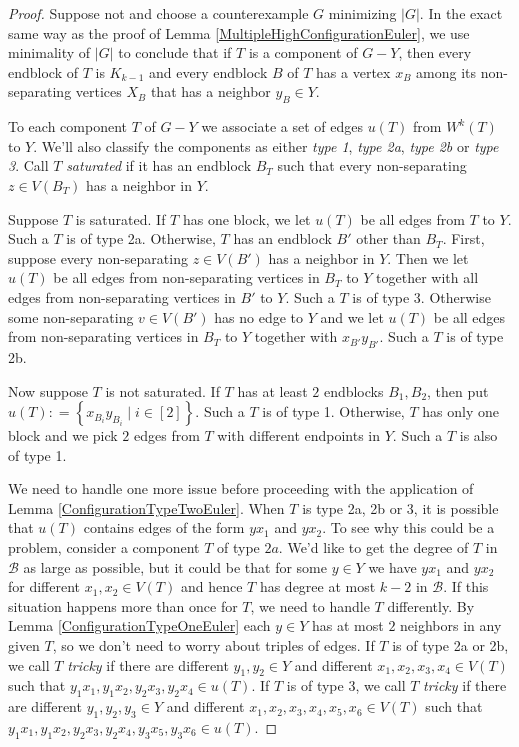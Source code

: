\documentclass[12pt]{article}
\theoremstyle{plain}
\theoremstyle{definition}
\theoremstyle{remark}
\newcommand{\fancy}[1]{\mathcal{#1}}
\newcommand{\B}{\fancy{B}}
\newcommand{\setbs}[2]{\left\{ #1 \mid #2 \right\}}
\newcommand{\card}[1]{\left|#1\right|}
\newcommand{\irange}[1]{\left[#1\right]}
\newcommand{\DefinedAs}{\mathrel{\mathop:}=}
\begin{document}
\begin{proof}
Suppose not and choose a counterexample $G$ minimizing $\card{G}$.  In the exact same way as the proof of Lemma \ref{MultipleHighConfigurationEuler}, we use minimality of $\card{G}$ to conclude that if $T$ is a component of $G-Y$, then every endblock of $T$ is $K_{k-1}$ and every endblock $B$ of $T$ has a vertex $x_B$ among its non-separating vertices $X_B$ that has a neighbor $y_B \in Y$.

To each component $T$ of $G-Y$ we associate a set of edges $u(T)$ from $W^k(T)$ to $Y$. We'll also classify the components as either \emph{type 1}, \emph{type 2a}, \emph{type 2b} or \emph{type 3}. Call $T$ \emph{saturated} if it has an endblock $B_T$ such that every non-separating $z \in V(B_T)$ has a neighbor in $Y$.  

Suppose $T$ is saturated.  If $T$ has one block, we let $u(T)$ be all edges from $T$ to $Y$.  Such a $T$ is of type 2a.  Otherwise, $T$ has an endblock $B'$ other than $B_T$.  First, suppose every non-separating $z \in V(B')$ has a neighbor in $Y$.  Then we let $u(T)$ be all edges from non-separating vertices in $B_T$ to $Y$ together with all edges from non-separating vertices in $B'$ to $Y$.  Such a $T$ is of type 3.  Otherwise some non-separating $v \in V(B')$ has no edge to $Y$ and we let $u(T)$ be all edges from non-separating vertices in $B_T$ to $Y$ together with $x_{B'}y_{B'}$.  Such a $T$ is of type 2b.

Now suppose $T$ is not saturated.  If $T$ has at least $2$ endblocks $B_1, B_2$, then put $u(T) \DefinedAs \setbs{x_{B_i}y_{B_i}}{i \in \irange{2}}$.  Such a $T$ is of type 1.  Otherwise, $T$ has only one block and we pick $2$ edges from $T$ with different endpoints in $Y$.  Such a $T$ is also of type 1.  

We need to handle one more issue before proceeding with the application of Lemma \ref{ConfigurationTypeTwoEuler}.  When $T$ is type 2a, 2b or 3, it is possible that $u(T)$ contains edges of the form $yx_1$ and $yx_2$.  To see why this could be a problem, consider a component $T$ of type $2a$.  We'd like to get the degree of $T$ in $\B$ as large as possible, but it could be that for some $y \in Y$ we have $yx_1$ and $yx_2$ for different $x_1, x_2 \in V(T)$ and hence $T$ has degree at most $k-2$ in $\B$.  If this situation happens more than once for $T$, we need to handle $T$ differently.  By Lemma \ref{ConfigurationTypeOneEuler} each $y \in Y$ has at most $2$ neighbors in any given $T$, so we don't need to worry about triples of edges.  If $T$ is of type 2a or 2b, we call $T$ \emph{tricky} if there are different $y_1, y_2 \in Y$ and different $x_1, x_2, x_3, x_4 \in V(T)$ such that $y_1x_1, y_1x_2, y_2x_3, y_2x_4 \in u(T)$.  If $T$ is of type 3, we call $T$ \emph{tricky} if there are different $y_1, y_2, y_3 \in Y$ and different $x_1, x_2, x_3, x_4, x_5, x_6 \in V(T)$ such that $y_1x_1, y_1x_2, y_2x_3, y_2x_4, y_3x_5, y_3x_6 \in u(T)$.


\end{proof}
\end{document}
